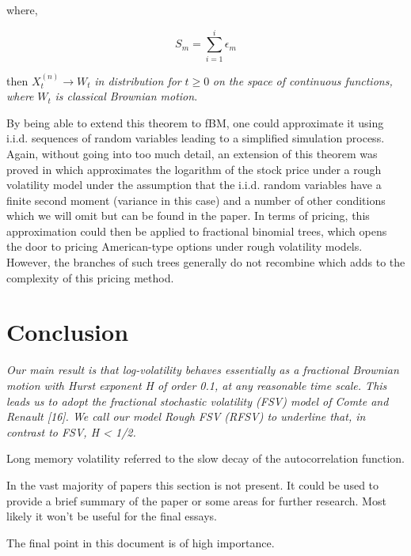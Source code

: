 \documentclass[12pt,oneside]{article}
\begin{document}
 where,
 
\begin{equation}
S_m = \sum_{i=1}^i \epsilon_m
\end{equation}

then $X_t^{(n)} \rightarrow W_t$ \emph{in distribution for} $t\ge0$ \emph{on the space of continuous functions, where} $W_t$ \emph{is classical Brownian motion}.

By being able to extend this theorem to fBM, one could approximate it using i.i.d. sequences of random variables leading to a simplified simulation process. Again, without going into too much detail, an extension of this theorem was proved in \cite{horvath2019functional} which approximates the logarithm of the stock price under a rough volatility model under the assumption that the i.i.d. random variables have a finite second moment (variance in this case) and a number of other conditions which we will omit but can be found in the paper. In terms of pricing, this approximation could then be applied to fractional binomial trees, which opens the door to pricing American-type options under rough volatility models. However, the branches of such trees generally do not recombine which adds to the complexity of this pricing method.   

\section{Conclusion}
\label{sec:conclusion}
 

\emph{Our main result is
that log-volatility behaves essentially as a fractional Brownian motion
with Hurst exponent H of order 0.1, at any reasonable time scale.
This leads us to adopt the fractional stochastic volatility (FSV) model
of Comte and Renault [16]. We call our model Rough FSV (RFSV)
to underline that, in contrast to FSV, H < 1/2.}

Long memory volatility referred to the slow decay of the autocorrelation function.

In the vast majority of papers this section is not present. It could be used to provide a brief summary of the paper or some areas for further research. Most likely it won't be useful for the final essays.

The final point in this document is of high importance. 



\end{document}
